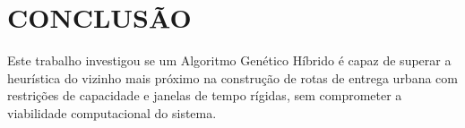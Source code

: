 \chapter{CONCLUSÃO}
\label{cap:conclusao}

Este trabalho investigou se um Algoritmo Genético Híbrido é capaz de superar a
heurística do vizinho mais próximo na construção de rotas de entrega urbana com
restrições de capacidade e janelas de tempo rígidas, sem comprometer a viabilidade
computacional do sistema.

